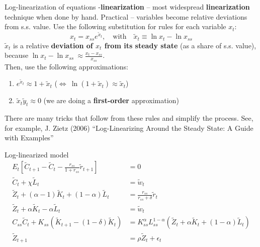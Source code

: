 \documentclass{beamer}
\newcommand{\tr}[1]{{\color{red}{\textbf{#1}}}}
\begin{document}
\begin{frame}{Log-linearization of equations}
  \tr{Log}-\textbf{linearization} -- most widespread \textbf{linearization} technique when done by hand. Practical -- variables become relative deviations from s.s. value. 
  \vfill
  Use  the following substitution for rules for each variable $x_t$: 
  $$x_t = x_{ss} e^{\tilde x_t}, \quad \text{with} \quad \tilde x_t \equiv \ln x_t - \ln x_{ss}$$ 
\vfill
$\tilde x_t$ is a relative \textbf{deviation of $x_t$ from its steady state} (as a share of s.s. value), because $\ln x_t - \ln x_{ss} ~\approx \frac{x_t - x_{ss}}{x_{ss}}$. \\
  \vfill
  Then, use the following approximations:
  \begin{enumerate}
	\item $e^{\tilde x_t} \approx 1 + \tilde x_t$ ($\Leftrightarrow \ \ln (1+\tilde x_t) \approx \tilde x_t$)
	\item $\tilde x_t \tilde y_t \approx 0$  (we are doing a \textbf{first-order} approximation) 
  \end{enumerate}
  \vfill
  There are many tricks that follow from these rules and simplify the process. See, for example, J. Zietz (2006) ``Log-Linearizing Around the Steady State: A Guide with Examples''
\end{frame}

\begin{frame}{Log-linearized model}
  \begin{align*}
	 E_t \left[ \tilde C_{t+1} - \tilde C_{t} - \frac{r_{ss}}{1+r_{ss}}\tilde r_{t+1}\right] &= 0 \\
	  \tilde C_t + \chi \tilde L_t &=  \tilde w_t \\
	  \tilde Z_t + (\alpha -1) \tilde K_t + (1-\alpha) \tilde L_t &= \frac{r_{ss}}{r_{ss}+\delta}\tilde r_t \\
	  \tilde Z_t + \alpha \tilde K_t -\alpha \tilde L_t &= \tilde w_t \\
	  C_{ss} \tilde C_t + K_{ss} (\tilde K_{t+1} - (1-\delta) \tilde K_t) &= K_{ss}^\alpha L_{ss}^{1-\alpha}(\tilde Z_t + \alpha \tilde K_t + (1-\alpha) \tilde L_t) \\
	  \tilde Z_{t+1} &= \rho \tilde Z_t + \epsilon_t
  \end{align*}
  
\end{frame}
\end{document}
